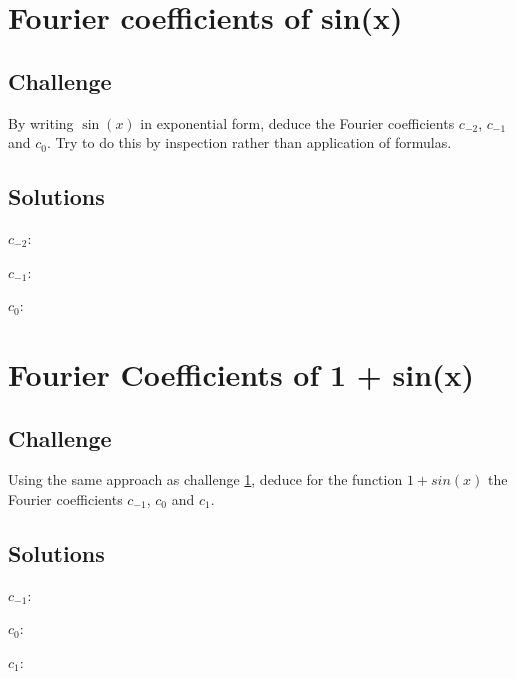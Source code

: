 \newpage
\section{Fourier coefficients of sin(x)}
\label{sec:fcsinx}

\subsection*{Challenge}
By writing $\sin(x)$ in exponential form, deduce the Fourier coefficients $c_{-2}$, $c_{-1}$ and $c_0$. Try to do this by inspection rather than application of formulas.

\subsection*{Solutions}
$c_{-2}$:\\

$c_{-1}$:\\

$c_0$:\\




\newpage

\section{Fourier Coefficients of 1 + sin(x)}
\label{sec:fcsinxp1}

\subsection*{Challenge}
Using the same approach as challenge \ref{sec:fcsinx}, deduce for the function $1+sin(x)$ the Fourier coefficients $c_{-1}$, $c_0$ and $c_1$.

\subsection*{Solutions}
$c_{-1}$:\\

$c_0$:\\

$c_1$:\\





